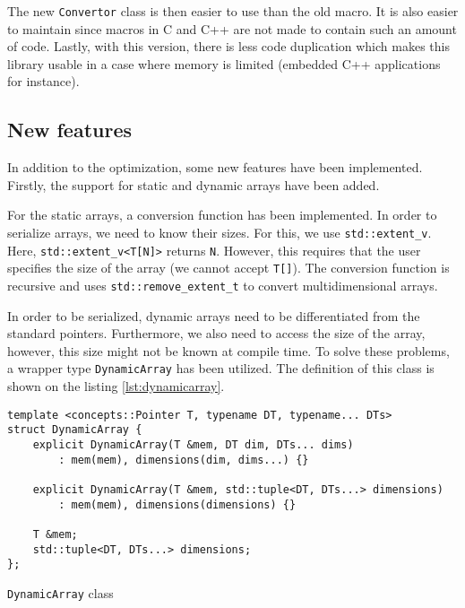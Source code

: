 The new \texttt{Convertor} class is then easier to use than the old macro. It
is also easier to maintain since macros in C and C++ are not made to contain
such an amount of code. Lastly, with this version, there is less code
duplication which makes this library usable in a case where memory is limited
(embedded C++ applications for instance).

\subsection{New features}

In addition to the optimization, some new features have been implemented.
Firstly, the support for static and dynamic arrays have been added.

For the static arrays, a conversion function has been implemented. In order to
serialize arrays, we need to know their sizes. For this, we use
\texttt{std::extent\_v}. Here, \texttt{std::extent\_v<T[N]>} returns \texttt{N}.
However, this requires that the user specifies the size of the array (we cannot
accept \texttt{T[]}). The conversion function is recursive and uses
\texttt{std::remove\_extent\_t} to convert multidimensional arrays.


In order to be serialized, dynamic arrays need to be differentiated from the
standard pointers. Furthermore, we also need to access the size of the array,
however, this size might not be known at compile time. To solve these problems,
a wrapper type \texttt{DynamicArray} has been utilized. The definition of this
class is shown on the listing \ref{lst:dynamicarray}.

\begin{listing}[ht!]
\begin{verbatim}
template <concepts::Pointer T, typename DT, typename... DTs>
struct DynamicArray {
    explicit DynamicArray(T &mem, DT dim, DTs... dims)
        : mem(mem), dimensions(dim, dims...) {}

    explicit DynamicArray(T &mem, std::tuple<DT, DTs...> dimensions)
        : mem(mem), dimensions(dimensions) {}

    T &mem;
    std::tuple<DT, DTs...> dimensions;
};
\end{verbatim}
\caption{\texttt{DynamicArray} class}
\label{lst:dynamicarray}
\end{listing}

